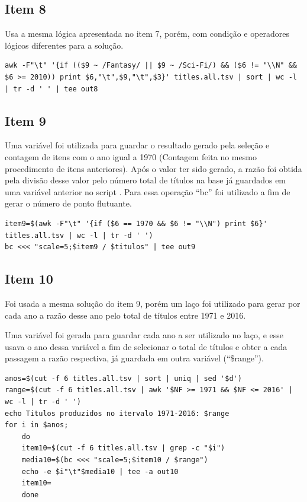 \documentclass[12pt]{article}
\begin{document}
\subsection*{Item 8}

Usa a mesma lógica apresentada no item 7, porém, com condição e operadores lógicos diferentes para a solução.

\begin{verbatim}
awk -F"\t" '{if (($9 ~ /Fantasy/ || $9 ~ /Sci-Fi/) && ($6 != "\\N" && $6 >= 2010)) print $6,"\t",$9,"\t",$3}' titles.all.tsv | sort | wc -l | tr -d ' ' | tee out8
\end{verbatim}

\subsection*{Item 9}

Uma variável foi utilizada para guardar o resultado gerado pela seleção e contagem de itens com o ano igual a 1970 (Contagem feita no mesmo procedimento de itens anteriores). Após o valor ter sido gerado, a razão foi obtida pela divisão desse valor pelo número total de títulos na base já guardados em uma variável anterior no script . Para essa operação ``bc''  foi utilizado a fim de gerar o número de ponto flutuante.

\begin{verbatim}
item9=$(awk -F"\t" '{if ($6 == 1970 && $6 != "\\N") print $6}' titles.all.tsv | wc -l | tr -d ' ')
bc <<< "scale=5;$item9 / $titulos" | tee out9
\end{verbatim}

\subsection*{Item 10}

Foi usada a mesma solução do item 9, porém um laço foi utilizado para gerar por cada ano a razão desse ano pelo total de títulos entre 1971 e 2016.

Uma variável foi gerada para guardar cada ano a ser utilizado no laço, e esse usava o ano dessa variável a fim de selecionar o total de títulos e obter a cada passagem a razão respectiva, já guardada em outra variável (``\$range'').

\begin{verbatim}
anos=$(cut -f 6 titles.all.tsv | sort | uniq | sed '$d')
range=$(cut -f 6 titles.all.tsv | awk '$NF >= 1971 && $NF <= 2016' | wc -l | tr -d ' ')
echo Titulos produzidos no itervalo 1971-2016: $range
for i in $anos;
	do
	item10=$(cut -f 6 titles.all.tsv | grep -c "$i")
	media10=$(bc <<< "scale=5;$item10 / $range")
	echo -e $i"\t"$media10 | tee -a out10
	item10=
	done
\end{verbatim}
\end{document}
